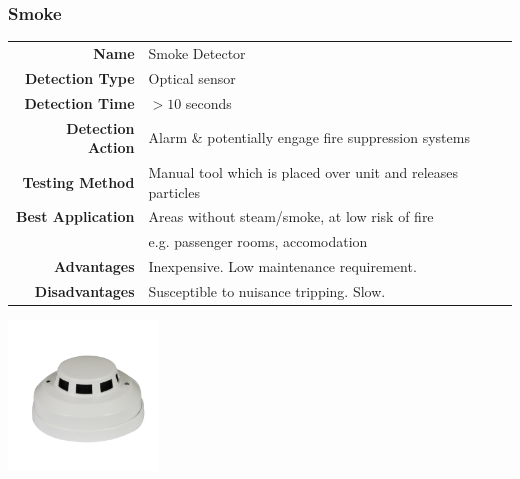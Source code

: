 \documentclass[11pt,a4paper]{article}
\begin{document}
\subsubsection{Smoke}
\begin{tabular}{|r|l|}
  \hline
\textbf{Name} & Smoke Detector \\
\textbf{Detection Type} & Optical sensor \\
\textbf{Detection Time} & $>10$ seconds \\
\textbf{Detection Action} & Alarm \& potentially engage fire suppression systems \\
\textbf{Testing Method} & Manual tool which is placed over unit and releases particles \\
\textbf{Best Application} & Areas without steam/smoke, at low risk of fire \\
& e.g. passenger rooms, accomodation\\
\textbf{Advantages} & Inexpensive. Low maintenance requirement. \\
\textbf{Disadvantages} & Susceptible to nuisance tripping. Slow. \\
  \hline
\end{tabular}
\begin{center}
\includegraphics[width=4cm]{smokedetector}
\end{center}
\end{document}
